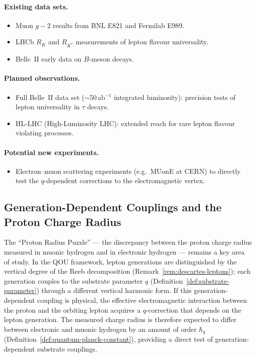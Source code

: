 \paragraph{Existing data sets.}
\begin{itemize}
  \item Muon $g-2$ results from BNL E821 and Fermilab E989.
  \item LHCb $R_K$ and $R_{K^*}$ measurements of lepton flavour
        universality.
  \item Belle~II early data on $B$-meson decays.
\end{itemize}

\paragraph{Planned observations.}
\begin{itemize}
  \item Full Belle~II data set ($\sim$50\,ab$^{-1}$ integrated luminosity):
        precision tests of
        lepton universality in $\tau$ decays.
  \item HL-LHC (High-Luminosity LHC): extended reach for rare lepton
        flavour violating processes.
\end{itemize}

\paragraph{Potential new experiments.}
\begin{itemize}
  \item Electron--muon scattering experiments (e.g.\ MUonE at CERN) to
        directly test the $q$-dependent corrections to the electromagnetic
        vertex.
\end{itemize}

\subsection{Generation-Dependent Couplings and the Proton Charge Radius}
\label{ssec:proton-radius}

\begin{remark}
\label{rem:proton-radius-puzzle}
The ``Proton Radius Puzzle'' --- the discrepancy between the proton charge
radius measured in muonic hydrogen and in electronic hydrogen --- remains a
key area of study.  In the QOU framework, lepton generations are distinguished
by the vertical degree of the Reeb decomposition
(Remark~\ref{rem:descartes-leptons}); each generation couples to the substrate
parameter $q$ (Definition~\ref{def:substrate-parameter}) through a different
vertical harmonic form.  If this generation-dependent coupling is physical, the
effective electromagnetic interaction between the proton and the orbiting lepton
acquires a $q$-correction that depends on the lepton generation.  The measured
charge radius is therefore expected to differ between electronic and muonic
hydrogen by an amount of order $\hbar_q$
(Definition~\ref{def:quantum-planck-constant}), providing a direct test of
generation-dependent substrate couplings.
\end{remark}

